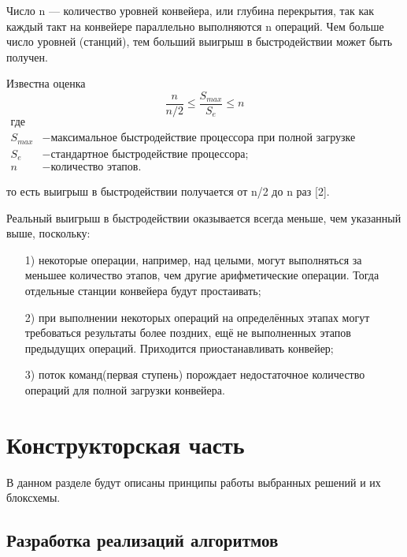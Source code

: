 \documentclass[a4paper,14pt]{report}
\begin{document}
Число n — количество уровней конвейера, или глубина перекрытия, так как каждый такт на конвейере параллельно выполняются n операций. Чем больше число уровней (станций), тем больший выигрыш в быстродействии может быть получен.

Известна оценка
\begin{equation}\label{form:way}
{\frac{n}{n/2} \leq {\frac{S_{max}}{S_{e}}} \leq n}
 \end{equation}
 \begin{align*}
    \text{где} \\
    S_{max} &- \text{максимальное быстродействие процессора  при полной загрузке конвейера;} \\
    S_{e} &- \text{стандартное быстродействие процессора;} \\
   n &- \text{количество этапов.}
\end{align*}

то есть выигрыш в быстродействии получается от n/2  до n раз [2].


Реальный выигрыш в быстродействии оказывается всегда меньше, чем указанный выше, поскольку:

\begin{enumerate}
\item[1)] некоторые операции, например, над целыми, могут выполняться за меньшее количество этапов, чем другие арифметические операции. Тогда отдельные станции конвейера будут простаивать;
\item[2)] при выполнении некоторых операций на определённых этапах могут требоваться результаты более поздних, ещё не выполненных этапов предыдущих операций. Приходится приостанавливать конвейер;
\item[3)] поток команд(первая ступень) порождает недостаточное количество операций для полной загрузки конвейера.
\end{enumerate}

\chapter*{Конструкторская часть}

В данном разделе будут описаны принципы работы выбранных решений и их блоксхемы.

\section*{Разработка реализаций алгоритмов}
\end{document}
